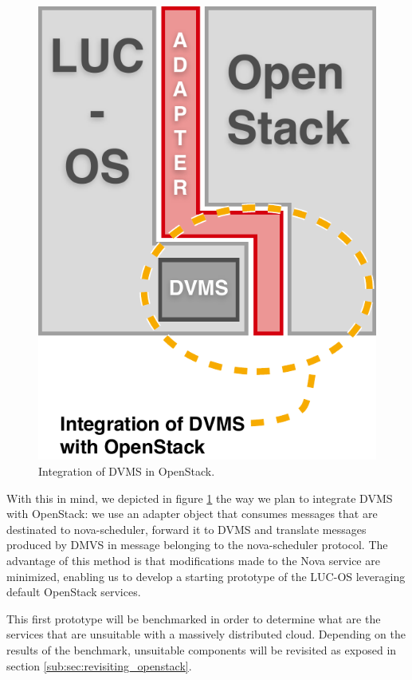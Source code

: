 \begin{figure}[h]
	\centering
	\includegraphics[width=0.50\linewidth]{Figures/dvms_openstack.pdf}
	\caption{Integration of DVMS in OpenStack.}%
	\label{fig:integration}%
\end{figure}

With this in mind, we depicted in figure \ref{fig:integration} the way we plan 
to integrate DVMS with OpenStack: we use an adapter object that consumes 
messages that are destinated to nova-scheduler, forward it to DVMS and translate
messages produced by DMVS in message belonging to the nova-scheduler protocol.
The advantage of this method is that modifications made to the Nova service are
minimized, enabling us to develop a starting prototype of the LUC-OS leveraging
default OpenStack services.

This first prototype will be benchmarked in order to determine what are the
services that are unsuitable with a massively distributed cloud. Depending on 
the results of the benchmark, unsuitable components will be revisited as exposed
in section \ref{sub:sec:revisiting_openstack}.
